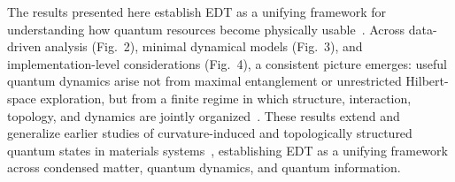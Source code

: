 \documentclass[twocolumn,10pt]{article}
\begin{document}





The results presented here establish EDT as a unifying framework for understanding how quantum resources become physically usable~\cite{Horodecki2009,Streltsov2017}. Across data-driven analysis (Fig.~2), minimal dynamical models (Fig.~3), and implementation-level considerations (Fig.~4), a consistent picture emerges: useful quantum dynamics arise not from maximal entanglement or unrestricted Hilbert-space exploration, but from a finite regime in which structure, interaction, topology, and dynamics are jointly organized~\cite{Amico2008,Eisert2010}. These results extend and generalize earlier studies of curvature-induced and topologically structured quantum states in materials systems~\cite{Hu2024_ACP,Hu2025_APQ,Hu2026_JPCM}, establishing EDT as a unifying framework across condensed matter, quantum dynamics, and quantum information.
\end{document}

